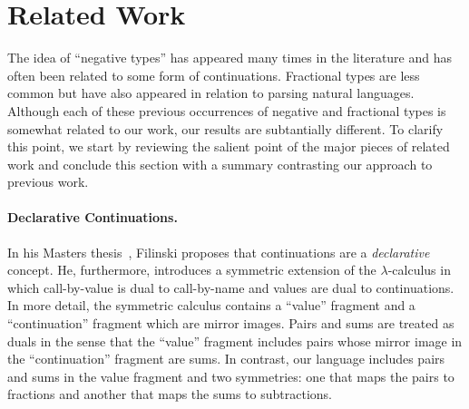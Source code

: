 \documentclass[preprint]{sigplanconf}
\begin{document}





\section{Related Work} 
\label{sec:related}

The idea of ``negative types'' has appeared many times in the literature and
has often been related to some form of continuations. Fractional types are
less common but have also appeared in relation to parsing natural
languages. Although each of these previous occurrences of negative and
fractional types is somewhat related to our work, our results are
subtantially different. To clarify this point, we start by reviewing the
salient point of the major pieces of related work and conclude this section
with a summary contrasting our approach to previous work.

\paragraph*{Declarative Continuations.} 
In his Masters thesis~\cite{Filinski:1989:DCI:648332.755574}, Filinski
proposes that continuations are a \emph{declarative} concept. He,
furthermore, introduces a symmetric extension of the $\lambda$-calculus in
which call-by-value is dual to call-by-name and values are dual to
continuations. In more detail, the symmetric calculus contains a ``value''
fragment and a ``continuation'' fragment which are mirror images. Pairs and
sums are treated as duals in the sense that the ``value'' fragment includes
pairs whose mirror image in the ``continuation'' fragment are sums. In
contrast, our language includes pairs and sums in the value fragment and two
symmetries: one that maps the pairs to fractions and another that maps the
sums to subtractions.
\end{document}
